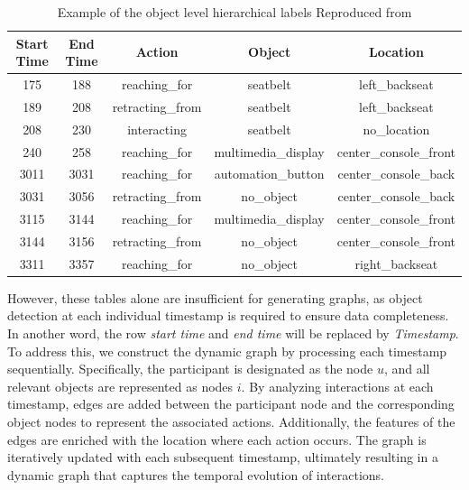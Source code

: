 \begin{table}[h!]
    \centering
    \begin{tabular}{ccccc}
    \toprule
    \textbf{Start Time} & \textbf{End Time} & \textbf{Action}         & \textbf{Object}               & \textbf{Location}           \\ 
    \midrule
    175                 & 188               & reaching\_for           & seatbelt                     & left\_backseat              \\ 
    \midrule
    189                 & 208               & retracting\_from        & seatbelt                     & left\_backseat              \\ 
    \midrule
    208                 & 230               & interacting             & seatbelt                     & no\_location                \\ 
    \midrule
    240                 & 258               & reaching\_for           & multimedia\_display          & center\_console\_front      \\ 
    \midrule
    3011                & 3031              & reaching\_for           & automation\_button           & center\_console\_back       \\ 
    \midrule
    3031                & 3056              & retracting\_from        & no\_object                   & center\_console\_back       \\ 
    \midrule
    3115                & 3144              & reaching\_for           & multimedia\_display          & center\_console\_front      \\ 
    \midrule
    3144                & 3156              & retracting\_from        & no\_object                   & center\_console\_front      \\ 
    \midrule
    3311                & 3357              & reaching\_for           & no\_object                   & right\_backseat             \\ 
    \bottomrule
    \end{tabular}
    \caption{Example of the  object level hierarchical labels Reproduced from\cite{9009583}}
    \label{tab:hierarchical_labels_object}
    \end{table}
    


However, these tables alone are insufficient for generating graphs, as object detection at each individual timestamp is required to ensure data completeness. In another word, the row \textit{start time} and \textit{end time} will be replaced by \textit{Timestamp}. To address this, we construct the dynamic graph by processing each timestamp sequentially. Specifically, the participant is designated as the node $u$, and all relevant objects are represented as nodes $i$. By analyzing interactions at each timestamp, edges are added between the participant node and the corresponding object nodes to represent the associated actions. Additionally, the features of the edges are enriched with the location where each action occurs. The graph is iteratively updated with each subsequent timestamp, ultimately resulting in a dynamic graph that captures the temporal evolution of interactions.
    


